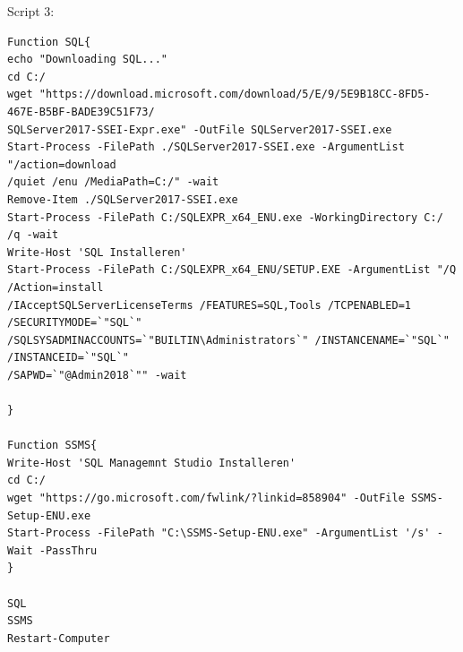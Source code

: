 \documentclass[a4paper]{article}
\begin{document}
Script 3:

\begin{verbatim}
Function SQL{
echo "Downloading SQL..."
cd C:/
wget "https://download.microsoft.com/download/5/E/9/5E9B18CC-8FD5-467E-B5BF-BADE39C51F73/
SQLServer2017-SSEI-Expr.exe" -OutFile SQLServer2017-SSEI.exe
Start-Process -FilePath ./SQLServer2017-SSEI.exe -ArgumentList "/action=download 
/quiet /enu /MediaPath=C:/" -wait
Remove-Item ./SQLServer2017-SSEI.exe
Start-Process -FilePath C:/SQLEXPR_x64_ENU.exe -WorkingDirectory C:/ /q -wait
Write-Host 'SQL Installeren'
Start-Process -FilePath C:/SQLEXPR_x64_ENU/SETUP.EXE -ArgumentList "/Q /Action=install 
/IAcceptSQLServerLicenseTerms /FEATURES=SQL,Tools /TCPENABLED=1 /SECURITYMODE=`"SQL`" 
/SQLSYSADMINACCOUNTS=`"BUILTIN\Administrators`" /INSTANCENAME=`"SQL`" /INSTANCEID=`"SQL`" 
/SAPWD=`"@Admin2018`"" -wait

}

Function SSMS{
Write-Host 'SQL Managemnt Studio Installeren'
cd C:/
wget "https://go.microsoft.com/fwlink/?linkid=858904" -OutFile SSMS-Setup-ENU.exe
Start-Process -FilePath "C:\SSMS-Setup-ENU.exe" -ArgumentList '/s' -Wait -PassThru
}

SQL
SSMS
Restart-Computer

\end{verbatim}
\end{document}
